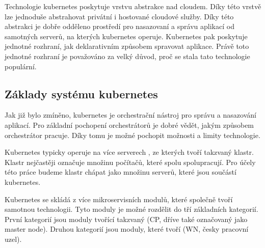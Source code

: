 Technologie kubernetes poskytuje vrstvu abstrakce nad cloudem. Díky této vrstvě lze jednoduše abstrahovat privátní i hostované cloudové služby. Díky této abstrakci je dobře odděleno prostředí pro nasazovaní a správu aplikací od samotných serverů, na kterých kubernetes operuje. Kubernetes pak poskytuje jednotné rozhraní, jak deklarativním způsobem spravovat aplikace. Právě toto jednotné rozhraní je považováno za velký důvod, proč se stala tato technologie populární.\cite{darinpope_2019_devops}

\subsection{Základy systému kubernetes}

Jak již bylo zmíněno, kubernetes je orchestrační nástroj pro správu a nasazování aplikací. Pro základní pochopení orchestrátorů je dobré vědět, jakým způsobem orchestrátor pracuje. Díky tomu je možné pochopit možnosti a limity technologie.

Kubernetes typicky operuje na více serverech , ze kterých tvoří takzvaný klastr. Klastr nejčastěji označuje množinu počítačů, které spolu spolupracují. Pro účely této práce budeme klastr chápat jako množinu serverů, které jsou součástí kubernetes.

Kubernetes se skládá z více mikroservisních modulů, které společně tvoří samotnou technologii. Tyto moduly je možné rozdělit do tří základních kategorií. První kategorií jsou moduly tvořící takzvaný (CP, dříve také označovaný jako master node). Druhou kategorií jsou moduly, které tvoří (WN, česky pracovní uzel).


